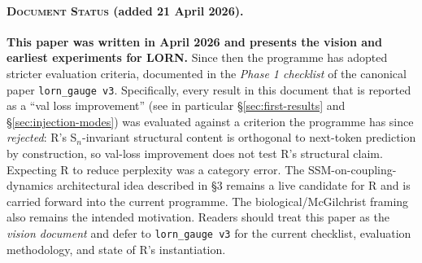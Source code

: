 \documentclass[11pt, a4paper]{article}
\theoremstyle{plain}
\theoremstyle{definition}
\theoremstyle{remark}
\begin{document}
\begin{abstract}
The right network does not see tokens.
It sees the left network's internal coupling patterns and compresses them into relational state.
Its loss forces \emph{coherence}, not through labelled metaphors or contrastive pairs, but through the pressure to find states that make the left's coupling patterns fit together as one relational structure.
The interaction between the two networks is what produces representations that are simultaneously specific enough to predict and general enough to transfer.

Preliminary results: with additive injection, the learned gate opens to 81\% during co-evolution and val loss improves by 0.55 nats (though parameter-matched baselines achieve similar gains).
With coupling bias injection, where R modulates L's attention patterns rather than its content stream, the gate stays open at 86\% and val loss improves by 0.33 nats over baseline, with R's states clustering by syntactic structure (4.9$\times$ separation ratio between structural groups).
The interaction is productive, and it emerges from training, not from architectural prescription.
\end{abstract}


\paragraph{\textsc{Document Status} (added 21 April 2026).}
\textbf{This paper was written in April 2026 and presents the vision and earliest experiments for LORN.}
Since then the programme has adopted stricter evaluation criteria, documented in the \emph{Phase 1 checklist} of the canonical paper \texttt{lorn\_gauge v3}.
Specifically, every result in this document that is reported as a ``val loss improvement'' (see in particular \S\ref{sec:first-results} and \S\ref{sec:injection-modes}) was evaluated against a criterion the programme has since \emph{rejected}: R's S$_n$-invariant structural content is orthogonal to next-token prediction by construction, so val-loss improvement does not test R's structural claim.
Expecting R to reduce perplexity was a category error.
The SSM-on-coupling-dynamics architectural idea described in \S3 remains a live candidate for R and is carried forward into the current programme.
The biological/McGilchrist framing also remains the intended motivation.
Readers should treat this paper as the \emph{vision document} and defer to \texttt{lorn\_gauge v3} for the current checklist, evaluation methodology, and state of R's instantiation.
\end{document}
